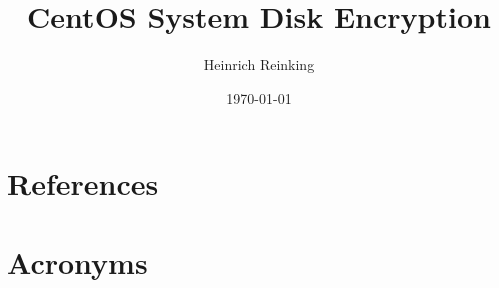\documentclass[PMO,authoryear,toc]{lsstdoc}
\title{CentOS System Disk Encryption}
\author{%
Heinrich Reinking
}
\date {\today}
\begin{document}
\maketitle



\appendix
\section{References} \label{sec:bib}
\renewcommand{\refname}{} %


\section{Acronyms} \label{sec:acronyms}

\end{document}

